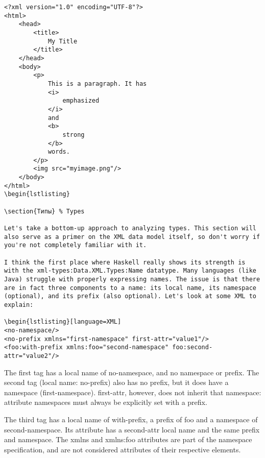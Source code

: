 \begin{lstlisting}[language=XHTML]
<?xml version="1.0" encoding="UTF-8"?>
<html>
    <head>
        <title>
            My Title
        </title>
    </head>
    <body>
        <p>
            This is a paragraph. It has 
            <i>
                emphasized
            </i>
            and 
            <b>
                strong
            </b>
            words.
        </p>
        <img src="myimage.png"/>
    </body>
</html>
\begin{lstlisting}

\section{Типы} % Types

Let's take a bottom-up approach to analyzing types. This section will also serve as a primer on the XML data model itself, so don't worry if you're not completely familiar with it.

I think the first place where Haskell really shows its strength is with the xml-types:Data.XML.Types:Name datatype. Many languages (like Java) struggle with properly expressing names. The issue is that there are in fact three components to a name: its local name, its namespace (optional), and its prefix (also optional). Let's look at some XML to explain:

\begin{lstlisting}[language=XML]
<no-namespace/>
<no-prefix xmlns="first-namespace" first-attr="value1"/>
<foo:with-prefix xmlns:foo="second-namespace" foo:second-attr="value2"/>
\end{lstlisting}

The first tag has a local name of no-namespace, and no namespace or prefix. The second tag (local name: no-prefix) also has no prefix,  but it does have a namespace (first-namespace). first-attr, however, does not inherit that namespace: attribute namespaces must always be explicitly set with a prefix.


The third tag has a local name of with-prefix, a prefix of foo and a namespace of second-namespace. Its attribute has a second-attr local name and the same prefix and namespace. The xmlns and xmlns:foo attributes are part of the namespace
specification, and are not considered attributes of their respective elements.

